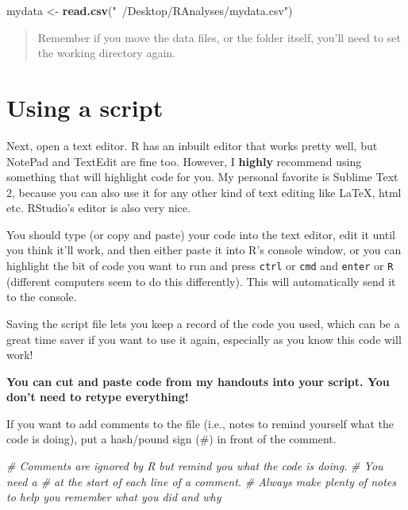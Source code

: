 \documentclass[]{book}
\newenvironment{Shaded}{\begin{snugshade}}{\end{snugshade}}
\newcommand{\KeywordTok}[1]{\textcolor[rgb]{0.13,0.29,0.53}{\textbf{{#1}}}}
\newcommand{\StringTok}[1]{\textcolor[rgb]{0.31,0.60,0.02}{{#1}}}
\newcommand{\CommentTok}[1]{\textcolor[rgb]{0.56,0.35,0.01}{\textit{{#1}}}}
\newcommand{\NormalTok}[1]{{#1}}
\begin{document}
\begin{Shaded}
\begin{Highlighting}[]
\NormalTok{mydata <-}\StringTok{ }\KeywordTok{read.csv}\NormalTok{(}\StringTok{"~/Desktop/RAnalyses/mydata.csv"}\NormalTok{)}
\end{Highlighting}
\end{Shaded}

\begin{quote}
Remember if you move the data files, or the folder itself, you'll need
to set the working directory again.
\end{quote}

\section{Using a script}\label{using-a-script}

Next, open a text editor. R has an inbuilt editor that works pretty
well, but NotePad and TextEdit are fine too. However, I \textbf{highly}
recommend using something that will highlight code for you. My personal
favorite is Sublime Text 2, because you can also use it for any other
kind of text editing like LaTeX, html etc. RStudio's editor is also very
nice.

You should type (or copy and paste) your code into the text editor, edit
it until you think it'll work, and then either paste it into R's console
window, or you can highlight the bit of code you want to run and press
\texttt{ctrl} or \texttt{cmd} and \texttt{enter} or \texttt{R}
(different computers seem to do this differently). This will
automatically send it to the console.

Saving the script file lets you keep a record of the code you used,
which can be a great time saver if you want to use it again, especially
as you know this code will work!

\textbf{You can cut and paste code from my handouts into your script.
You don't need to retype everything!}

If you want to add comments to the file (i.e., notes to remind yourself
what the code is doing), put a hash/pound sign (\#) in front of the
comment.

\begin{Shaded}
\begin{Highlighting}[]
\CommentTok{# Comments are ignored by R but remind you what the code is doing. }
\CommentTok{# You need a # at the start of each line of a comment.}
\CommentTok{# Always make plenty of notes to help you remember what you did and why}
\end{Highlighting}
\end{Shaded}
\end{document}

